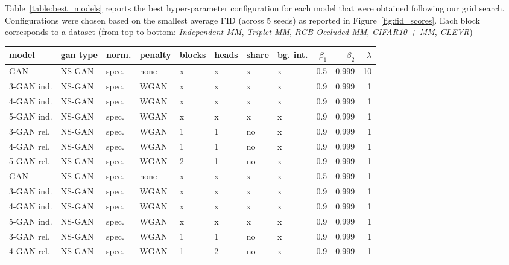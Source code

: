 \documentclass{article}
\begin{document}
Table~\ref{table:best_models} reports the best hyper-parameter configuration for each model that were obtained following our grid search.
Configurations were chosen based on the smallest average FID (across 5 seeds) as reported in Figure~\ref{fig:fid_scores}.
Each block corresponds to a dataset (from top to bottom: \emph{Independent MM}, \emph{Triplet MM}, \emph{RGB Occluded MM}, \emph{CIFAR10 + MM}, \emph{CLEVR})

\begin{table}[h]
\centering
\begin{tabular}{llllllllrrr}
\toprule
      model & gan type & norm. & penalty & blocks & heads &  share &  bg. int. &  $\beta_1$ &  $\beta_2$ &  $\lambda$ \\
\midrule
        GAN &   NS-GAN &    spec. &    none &      x &     x &  x &       x &    0.5 &  0.999 &      10 \\
 3-GAN ind. &   NS-GAN &    spec. &    WGAN &      x &     x &  x &       x &    0.9 &  0.999 &       1 \\
 4-GAN ind. &   NS-GAN &    spec. &    WGAN &      x &     x &  x &       x &    0.9 &  0.999 &       1 \\
 5-GAN ind. &   NS-GAN &    spec. &    WGAN &      x &     x &  x &       x &    0.9 &  0.999 &       1 \\
 3-GAN rel. &   NS-GAN &    spec. &    WGAN &      1 &     1 &  no &       x &    0.9 &  0.999 &       1 \\
 4-GAN rel. &   NS-GAN &    spec. &    WGAN &      1 &     1 &  no &       x &    0.9 &  0.999 &       1 \\
 5-GAN rel. &   NS-GAN &    spec. &    WGAN &      2 &     1 &  no &       x &    0.9 &  0.999 &       1 \\
\midrule
        GAN &   NS-GAN &    spec. &    none &      x &     x &  x &       x &    0.5 &  0.999 &       1 \\
 3-GAN ind. &   NS-GAN &    spec. &    WGAN &      x &     x &  x &       x &    0.9 &  0.999 &       1 \\
 4-GAN ind. &   NS-GAN &    spec. &    WGAN &      x &     x &  x &       x &    0.9 &  0.999 &       1 \\
 5-GAN ind. &   NS-GAN &    spec. &    WGAN &      x &     x &  x &       x &    0.9 &  0.999 &       1 \\
 3-GAN rel. &   NS-GAN &    spec. &    WGAN &      1 &     1 &  no &       x &    0.9 &  0.999 &       1 \\
 4-GAN rel. &   NS-GAN &    spec. &    WGAN &      1 &     2 &  no &       x &    0.9 &  0.999 &       1 \\

\end{tabular}
\end{table}
\end{document}
